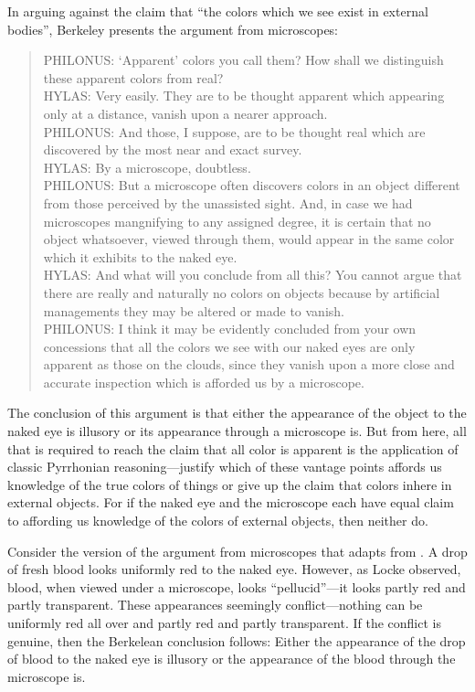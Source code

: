\documentclass[12pt]{article}
\begin{document}
In arguing against the claim that ``the colors which we see exist in external bodies'', Berkeley presents the argument from microscopes:
\begin{quote}
	PHILONUS: `Apparent' colors you call them? How shall we distinguish these apparent colors from real?\\
	HYLAS: Very easily. They are to be thought apparent which appearing only at a distance, vanish upon a nearer approach.\\
	PHILONUS: And those, I suppose, are to be thought real which are discovered by the most near and exact survey.\\
	HYLAS: By a microscope, doubtless.\\
	PHILONUS: But a microscope often discovers colors in an object different from those perceived by the unassisted sight. And, in case we had microscopes mangnifying to any assigned degree, it is certain that no object whatsoever, viewed through them, would appear in the same color which it exhibits to the naked eye.\\
	HYLAS: And what will you conclude from all this? You cannot argue that there are really and naturally no colors on objects because by artificial managements they may be altered or made to vanish.\\
	PHILONUS: I think it may be evidently concluded from your own concessions that all the colors we see with our naked eyes are only apparent as those on the clouds, since they vanish upon a more close and accurate inspection which is afforded us by a microscope. \citep[xx]{Berkeley:1734fk}
\end{quote}
The conclusion of this argument is that either the appearance of the object to the naked eye is illusory or its appearance through a microscope is. But from here, all that is required to reach the claim that all color is apparent is the application of classic Pyrrhonian reasoning---justify which of these vantage points affords us knowledge of the true colors of things or give up the claim that colors inhere in external objects. For if the naked eye and the microscope each have equal claim to affording us knowledge of the colors of external objects, then neither do.

Consider the version of the argument from microscopes that \citet{Hilbert:1987jq} adapts from \citet{Marc-Wogau:1968kx}. A drop of fresh blood looks uniformly red to the naked eye. However, as Locke observed, blood, when viewed under a microscope, looks ``pellucid''---it looks partly red and partly transparent. These appearances seemingly conflict---nothing can be uniformly red all over and partly red and partly transparent. If the conflict is genuine, then the Berkelean conclusion follows: Either the appearance of the drop of blood to the naked eye is illusory or the appearance of the blood through the microscope is. 
\end{document}
